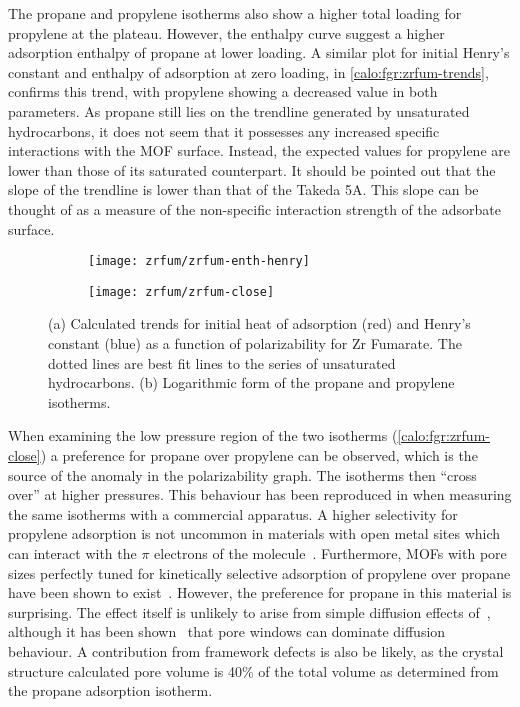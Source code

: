 The propane and propylene isotherms also show a higher total
loading for propylene at the plateau. However, the enthalpy
curve suggest a higher adsorption enthalpy of propane at lower
loading. A similar plot for initial Henry's constant and
enthalpy of adsorption at zero loading, in \autoref{calo:fgr:zrfum-trends},
confirms this trend, with propylene showing a decreased value
in both parameters. As propane still lies on the trendline generated
by unsaturated hydrocarbons, it does not seem that it possesses any
increased specific interactions with the MOF surface. Instead, 
the expected values for propylene are lower than those of its
saturated counterpart. It should be pointed out that the
slope of the trendline is lower than that of the Takeda 5A. This slope 
can be thought of as a measure of the non-specific interaction strength
of the adsorbate surface.

\begin{figure}[htb]
    \centering
    
    \begin{subfigure}[b]{0.5\textwidth}
        \centering
        \texttt{[image: zrfum/zrfum-enth-henry]}
        \caption{}%
        \label{calo:fgr:zrfum-trends}
    \end{subfigure}%
    \begin{subfigure}[b]{0.45\textwidth}
        \centering
        \texttt{[image: zrfum/zrfum-close]}
        \caption{}%
        \label{calo:fgr:zrfum-close}
    \end{subfigure}%
    \caption{(a) Calculated trends for initial heat of adsorption (red) and 
    Henry's constant (blue) as a function of polarizability for 
    Zr Fumarate. The dotted lines are best fit lines to 
    the series of unsaturated hydrocarbons. (b) Logarithmic form of the 
    propane and propylene isotherms.}%
    \label{calo:fgr:zrfum-analysis}

\end{figure}

When examining the low pressure region of the two isotherms 
(\autoref{calo:fgr:zrfum-close}) a preference for propane over
propylene can be observed, which is the source of the anomaly
in the polarizability graph. The isotherms then ``cross over'' 
at higher pressures.
This behaviour has been reproduced in when measuring the same 
isotherms with a commercial apparatus.
A higher selectivity for propylene adsorption is not uncommon
in materials with open metal sites which can interact with 
the \(\pi\) electrons of the 
molecule~\cite{rubesAdsorptionPropanePropylene2013}.
Furthermore, MOFs with pore sizes perfectly tuned for kinetically
selective adsorption of propylene over propane have been shown 
to exist~\cite{leeKineticSeparationPropene2011}. However,
the preference for propane in this material is surprising.
The effect itself is unlikely to arise from simple diffusion
effects of~\cite{granatoDiffusionPropanePropylene2010}, although
it has been shown~\cite{combarizaPropanePropyleneDiffusion2009}
that pore windows can dominate diffusion behaviour. A contribution
from framework defects is also be likely, as the 
crystal structure calculated pore volume is 40\% of the total
volume as determined from the propane adsorption isotherm.

